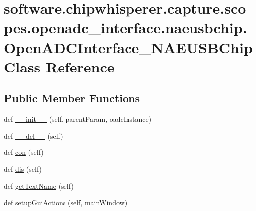 \hypertarget{classsoftware_1_1chipwhisperer_1_1capture_1_1scopes_1_1openadc__interface_1_1naeusbchip_1_1OpenADCInterface__NAEUSBChip}{}\section{software.\+chipwhisperer.\+capture.\+scopes.\+openadc\+\_\+interface.\+naeusbchip.\+Open\+A\+D\+C\+Interface\+\_\+\+N\+A\+E\+U\+S\+B\+Chip Class Reference}
\label{classsoftware_1_1chipwhisperer_1_1capture_1_1scopes_1_1openadc__interface_1_1naeusbchip_1_1OpenADCInterface__NAEUSBChip}
\subsection*{Public Member Functions}
\begin{DoxyCompactItemize}
\item 
def \hyperlink{classsoftware_1_1chipwhisperer_1_1capture_1_1scopes_1_1openadc__interface_1_1naeusbchip_1_1OpenADCInterface__NAEUSBChip_a2d9abc280dcb21b80e7508e5fbfa8a0d}{\+\_\+\+\_\+init\+\_\+\+\_\+} (self, parent\+Param, oadc\+Instance)
\item 
def \hyperlink{classsoftware_1_1chipwhisperer_1_1capture_1_1scopes_1_1openadc__interface_1_1naeusbchip_1_1OpenADCInterface__NAEUSBChip_a2ee43e9bf2fa425f8fa5de9f89747760}{\+\_\+\+\_\+del\+\_\+\+\_\+} (self)
\item 
def \hyperlink{classsoftware_1_1chipwhisperer_1_1capture_1_1scopes_1_1openadc__interface_1_1naeusbchip_1_1OpenADCInterface__NAEUSBChip_a02208e6117caec90122d70e5f8ce020d}{con} (self)
\item 
def \hyperlink{classsoftware_1_1chipwhisperer_1_1capture_1_1scopes_1_1openadc__interface_1_1naeusbchip_1_1OpenADCInterface__NAEUSBChip_a5d10b9e346e56732c0fe2f6698fd855f}{dis} (self)
\item 
def \hyperlink{classsoftware_1_1chipwhisperer_1_1capture_1_1scopes_1_1openadc__interface_1_1naeusbchip_1_1OpenADCInterface__NAEUSBChip_a1bdeec4296a61719b9177a5b28290043}{get\+Text\+Name} (self)
\item 
def \hyperlink{classsoftware_1_1chipwhisperer_1_1capture_1_1scopes_1_1openadc__interface_1_1naeusbchip_1_1OpenADCInterface__NAEUSBChip_a3b6ab69776259d4e281d13ce0091c849}{setup\+Gui\+Actions} (self, main\+Window)
\end{DoxyCompactItemize}

